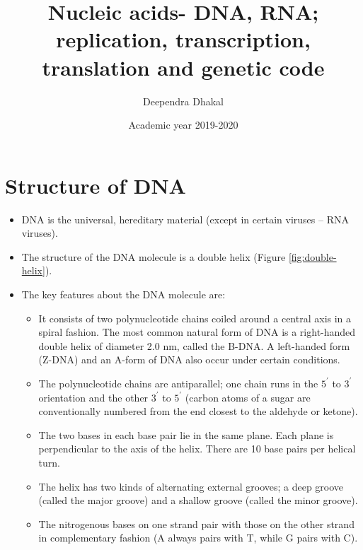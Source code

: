 \documentclass[11pt,ignorenonframetext,aspectratio=169]{beamer}
\title[]{Nucleic acids- DNA, RNA; replication, transcription, translation and
genetic code}
\author[
        Deependra Dhakal
    ]{Deependra Dhakal}
\institute[
    ]{
    Gokuleshwor Agriculture and Animal Science College\\
Tribhuwan University\\
\textit{ddhakal.rookie@gmail.com}\\
\url{https://rookie.rbind.io}
    }
\date[
      Academic year 2019-2020
  ]{
      Academic year 2019-2020
        }
\providecommand{\tightlist}{%
  \setlength{\itemsep}{0pt}\setlength{\parskip}{0pt}}
\begin{document}
  \begin{frame}[plain]
  \titlepage
  \end{frame}



\hypertarget{structure-of-dna}{%
\section{Structure of DNA}\label{structure-of-dna}}

\begin{frame}{}
\protect\hypertarget{section}{}

\begin{itemize}
\tightlist
\item
  DNA is the universal, hereditary material (except in certain viruses
  -- RNA viruses).
\item
  The structure of the DNA molecule is a double helix (Figure
  \ref{fig:double-helix}).
\item
  The key features about the DNA molecule are:

  \begin{itemize}
  \tightlist
  \item
    It consists of two polynucleotide chains coiled around a central
    axis in a spiral fashion. The most common natural form of DNA is a
    right-handed double helix of diameter 2.0 nm, called the B-DNA. A
    left-handed form (Z-DNA) and an A-form of DNA also occur under
    certain conditions.
  \item
    The polynucleotide chains are antiparallel; one chain runs in the
    \(5^\prime\) to \(3^\prime\) orientation and the other \(3^\prime\)
    to \(5^\prime\) (carbon atoms of a sugar are conventionally numbered
    from the end closest to the aldehyde or ketone).
  \item
    The two bases in each base pair lie in the same plane. Each plane is
    perpendicular to the axis of the helix. There are 10 base pairs per
    helical turn.
  \item
    The helix has two kinds of alternating external grooves; a deep
    groove (called the major groove) and a shallow groove (called the
    minor groove).
  \item
    The nitrogenous bases on one strand pair with those on the other
    strand in complementary fashion (A always pairs with T, while G
    pairs with C).
  \end{itemize}
\end{itemize}

\end{frame}
\end{document}
